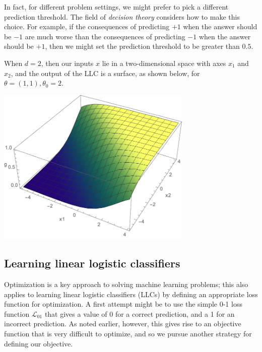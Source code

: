 In fact, for different problem settings, we might prefer to pick a
different prediction threshold.  The field of {\em decision theory}
considers how to make this choice.
For example, if the consequences of predicting $+1$ when
the answer should be $-1$ are much worse than the consequences of
predicting $-1$ when the answer should be $+1$, then we might set the
prediction threshold to be greater than $0.5$.


When $d = 2$, then our inputs $x$ lie in a two-dimensional space with
axes $x_1$ and $x_2$, and the output of the LLC is a surface, as shown
below, for $\theta = (1, 1), \theta_0 = 2$.

\includegraphics[width=0.7\textwidth]{figures/logreg3d}


\subsection{Learning linear logistic classifiers}

\label{logistic}

Optimization is a key approach to solving machine learning
problems; this also applies to learning linear logistic classifiers (LLCs) by
defining an appropriate loss function for optimization.
A first attempt might be to use the simple 0-1 loss function $\mathcal{L}_{01}$
that gives a value of 0 for a correct prediction, and a 1 for an
incorrect prediction. As noted earlier, however, this gives rise
to an objective function that is very difficult to optimize, and so
we pursue another strategy for defining our objective.

